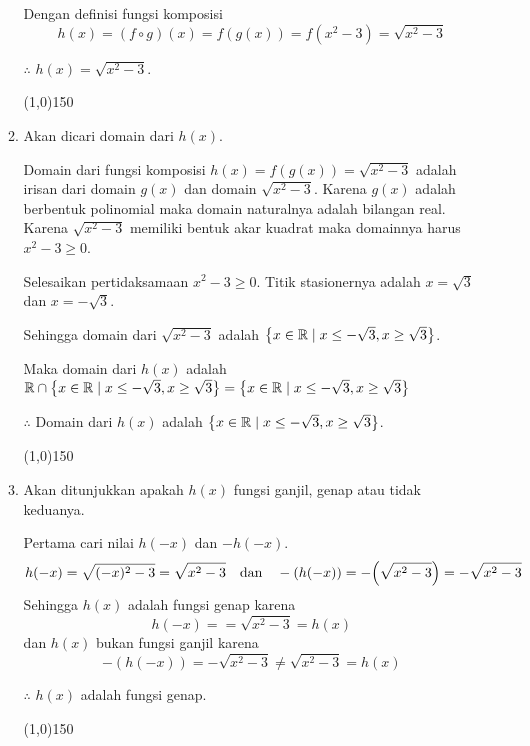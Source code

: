 \begin{enumerate}[leftmargin=*, label={\arabic*}.]
\begin{enumerate}[label={\alph*}.]
    Dengan definisi fungsi komposisi
    \[
    h(x)=(f \circ g)(x)=f(g(x))=f(x^{2}-3) = \sqrt{x^{2}-3}
    \]

    $\therefore$ $h(x) = \sqrt{x^{2}-3}$.


\begin{center}\line(1,0){150}\end{center}


    \item Akan dicari domain dari $h(x)$.
    
    Domain dari fungsi komposisi $h(x)=f(g(x))=\sqrt{x^{2}-3}$ adalah irisan 
    dari domain $g(x)$ dan domain $\sqrt{x^{2}-3}$. Karena $g(x)$ adalah berbentuk 
    polinomial maka domain naturalnya adalah bilangan real. Karena $\sqrt{x^{2}-3}$ 
    memiliki bentuk akar kuadrat maka domainnya harus $x^{2}-3 \geq 0$.
    
    Selesaikan pertidaksamaan $x^{2}-3 \geq 0$. Titik stasionernya adalah $x=\sqrt{3}$ 
    dan $x=-\sqrt{3}$.

    

    Sehingga domain dari $\sqrt{x^{2}-3}$ adalah 
    $\set*{x \in \mathbb{R} \mid x \leq -\sqrt{3}, x \geq \sqrt{3}}$.

    Maka domain dari $h(x)$ adalah $\mathbb{R} \cap 
    \set*{x \in \mathbb{R} \mid x \leq -\sqrt{3}, x \geq \sqrt{3}} 
    = \set*{x \in \mathbb{R} \mid x \leq -\sqrt{3}, x \geq \sqrt{3}}$

    $\therefore$ Domain dari $h(x)$ adalah 
    $\set*{x \in \mathbb{R} \mid x \leq -\sqrt{3}, x \geq \sqrt{3}}$. 


\begin{center}\line(1,0){150}\end{center}


    \item Akan ditunjukkan apakah $h(x)$ fungsi ganjil, genap atau tidak keduanya.
    
    Pertama cari nilai $h(-x)$ dan $-h(-x)$.
    \[
    h(-x) = \sqrt{(-x)^{2}-3} = \sqrt{x^{2}- 3} \quad \text{dan} \quad 
    -(h(-x)) = -\brk*{\sqrt{x^{2}- 3}} = -\sqrt{x^{2}- 3}
    \]   
    Sehingga $h(x)$ adalah fungsi genap karena
    \[
        h(-x) =  = \sqrt{x^{2}- 3} = h(x)
    \]
    dan $h(x)$ bukan fungsi ganjil karena 
    \[
        -(h(-x)) = -\sqrt{x^{2}- 3} \neq \sqrt{x^{2}- 3} = h(x)
    \]

    $\therefore$ $h(x)$ adalah fungsi genap.


\begin{center}\line(1,0){150}\end{center}



\end{enumerate}
\end{enumerate}
